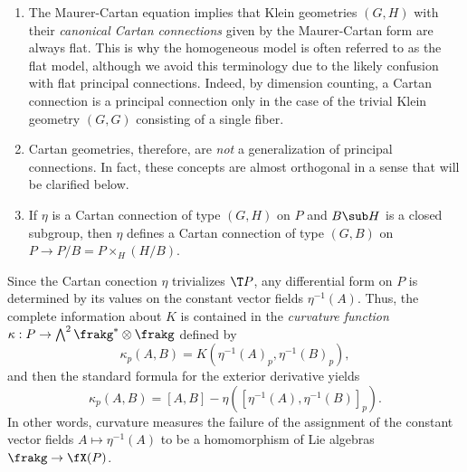 \begin{example}
    \begin{enumerate}
        \item The Maurer-Cartan equation implies that Klein geometries $(G,H)$ with their \emph{canonical Cartan connections} given by the Maurer-Cartan form are always flat. This is why the homogeneous model is often referred to as the flat model, although we avoid this terminology due to the likely confusion with flat principal connections. Indeed, by dimension counting, a Cartan connection is a principal connection only in the case of the trivial Klein geometry $(G,G)$ consisting of a single fiber.
        \item Cartan geometries, therefore, are \emph{not} a generalization of principal connections. In fact, these concepts are almost orthogonal in a sense that will be clarified below.
        \item If $\eta$ is a Cartan connection of type $(G,H)$ on $P$ and $B\sub H$ is a closed subgroup, then $\eta$ defines a Cartan connection of type $(G,B)$ on $P\to P\slash B= P\times_H (H\slash B)$.\label{xca V.3.6 Sharpe}
    \end{enumerate}
\end{example}



Since the Cartan conection $\eta$ trivializes $\T P$, any differential form on $P$ is determined by its values on the constant vector fields $\eta^{-1}(A)$. Thus, the complete information about $K$ is contained in the \emph{curvature function} $\kappa:P\to \bigwedge^2\frakg^\ast\otimes\frakg$ defined by 
\[\kappa_p(A,B)=K\left(\eta^{-1}(A)_p,\eta^{-1}(B)_p\right),\]
and then the standard formula for the exterior derivative yields 
\[\kappa_p(A,B)=[A,B]-\eta\left(\left[\eta^{-1}(A),\eta^{-1}(B)\right]_p\right).\]
In other words, curvature measures the failure of the assignment of the constant vector fields $A\mapsto \eta^{-1}(A)$ to be a homomorphism of Lie algebras $\frakg\to \fX(P)$.

